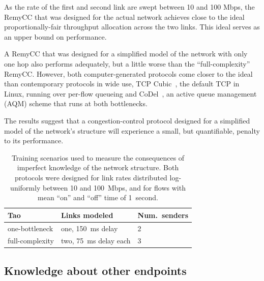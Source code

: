 
As the rate of the first and second link are swept between 10 and 100
Mbps, the RemyCC that was designed for the actual network achieves
close to the ideal proportionally-fair throughput allocation across
the two links. This ideal serves as an upper bound on performance.

A RemyCC that was designed for a simplified model of the network with
only one hop also performs adequately, but a little worse than the
``full-complexity'' RemyCC. However, both computer-generated protocols
come closer to the ideal than contemporary protocols in wide use, TCP
Cubic~\cite{cubic}, the default TCP in Linux, running over per-flow
queueing and CoDel~\cite{CoDel}, an active queue management (AQM)
scheme that runs at both bottlenecks.

The results suggest that a congestion-control protocol designed for a
simplified model of the network's structure will experience a small,
but quantifiable, penalty to its performance.

\begin{table}
\centering
\begin{tabular}{l|l|l}
\bf Tao & \bf Links modeled & \bf Num.~senders \\
\hline
one-bottleneck & one, 150~ms delay & 2 \\
full-complexity & two, 75~ms delay each & 3 \\
\end{tabular}
\caption{Training scenarios used to measure the consequences of imperfect
  knowledge of the network structure. Both protocols were designed for
  link rates distributed log-uniformly between 10 and 100~Mbps, and
  for flows with mean ``on'' and ``off'' time of 1~second.
}
\label{table:topology-training}
\end{table}

\subsection{Knowledge about other endpoints}

